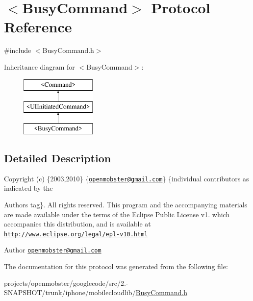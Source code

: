 \hypertarget{protocol_busy_command-p}{
\section{$<$\-Busy\-Command$>$ \-Protocol \-Reference}
\label{protocol_busy_command-p}
}


{\ttfamily \#include $<$\-Busy\-Command.\-h$>$}

\-Inheritance diagram for $<$\-Busy\-Command$>$\-:\begin{figure}[H]
\begin{center}
\leavevmode
\includegraphics[height=3.000000cm]{protocol_busy_command-p}
\end{center}
\end{figure}


\subsection{\-Detailed \-Description}
\-Copyright (c) \{2003,2010\} \{\href{mailto:openmobster@gmail.com}{\tt openmobster@gmail.\-com}\} \{individual contributors as indicated by the \begin{DoxyAuthor}{\-Authors}
tag\}. \-All rights reserved. \-This program and the accompanying materials are made available under the terms of the \-Eclipse \-Public \-License v1. which accompanies this distribution, and is available at \href{http://www.eclipse.org/legal/epl-v10.html}{\tt http\-://www.\-eclipse.\-org/legal/epl-\/v10.\-html}
\end{DoxyAuthor}
\begin{DoxyAuthor}{\-Author}
\href{mailto:openmobster@gmail.com}{\tt openmobster@gmail.\-com} 
\end{DoxyAuthor}


\-The documentation for this protocol was generated from the following file\-:\begin{DoxyCompactItemize}
\item 
projects/openmobster/googlecode/src/2.-\/\-S\-N\-A\-P\-S\-H\-O\-T/trunk/iphone/mobilecloudlib/\hyperlink{_busy_command_8h}{\-Busy\-Command.\-h}\end{DoxyCompactItemize}
